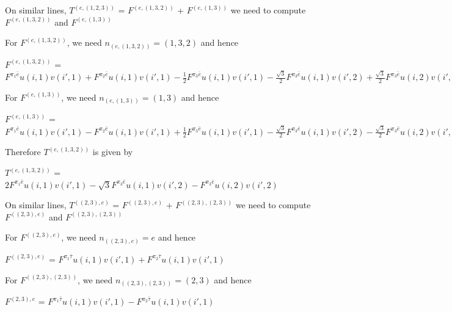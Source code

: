 On similar lines, $T^{(e,(1,2,3))}$ = $F^{(e,(1,3,2))}$ + $F^{(e,(1,3))}$ we need to compute $F^{(e,(1,3,2))}$ and $F^{(e,(1,3))}$

For $F^{(e,(1,3,2))}$, we need $n_{(e,(1,3,2))} = (1,3,2)$ and hence 
\begin{center}
$F^{(e,(1,3,2))}$ = $F^{\pi_{1}\bar{e}}u(i,1)v(i',1) + F^{\pi_{2}\bar{e}}u(i,1)v(i',1) 
              - \frac{1}{2}F^{\pi_{3}\bar{e}}u(i,1)v(i',1) - \frac{\sqrt{3}}{2}F^{\pi_{3}\bar{e}}u(i,1)v(i',2)
              + \frac{\sqrt{3}}{2}F^{\pi_{3}\bar{e}}u(i,2)v(i',1) - \frac{1}{2}F^{\pi_{3}\bar{e}}u(i,2)v(i',2)$
\end{center}
For $F^{(e,(1,3))}$, we need $n_{(e,(1,3))} = (1,3)$ and hence
\begin{center}
$F^{(e,(1,3))}$ = $F^{\pi_{1}\bar{e}}u(i,1)v(i',1) - F^{\pi_{2}\bar{e}}u(i,1)v(i',1) 
              + \frac{1}{2}F^{\pi_{3}\bar{e}}u(i,1)v(i',1) - \frac{\sqrt{3}}{2}F^{\pi_{3}\bar{e}}u(i,1)v(i',2)
              - \frac{\sqrt{3}}{2}F^{\pi_{3}\bar{e}}u(i,2)v(i',1) - \frac{1}{2}F^{\pi_{3}\bar{e}}u(i,2)v(i',2)$
\end{center}

Therefore $T^{(e,(1,3,2))}$ is given by 
\begin{center}
$T^{(e,(1,3,2))}$ = $2F^{\pi_{1}\bar{e}}u(i,1)v(i',1) - \sqrt{3}F^{\pi_{3}\bar{e}}u(i,1)v(i',2) 
                    -F^{\pi_{3}\bar{e}}u(i,2)v(i',2)$
\end{center}



On similar lines, $T^{((2,3),e)}$ = $F^{((2,3),e)}$ + $F^{((2,3),(2,3))}$ we need to compute $F^{((2,3),e)}$ and $F^{((2,3),(2,3))}$

For $F^{((2,3),e)}$, we need $n_{((2,3),e)} = e$ and hence 
\begin{center}
$F^{((2,3),e)}$ = $F^{\pi_{1}\bar{\tau}}u(i,1)v(i',1) + F^{\pi_{2}\bar{\tau}}u(i,1)v(i',1)$
\end{center}

For $F^{((2,3),(2,3))}$, we need $n_{((2,3),(2,3))} = (2,3)$ and hence
\begin{center}
$F^{(2,3),e}$ = $F^{\pi_{1}\bar{\tau}}u(i,1)v(i',1) - F^{\pi_{2}\bar{\tau}}u(i,1)v(i',1)$
\end{center}

